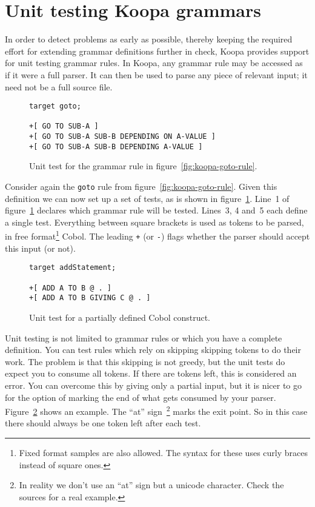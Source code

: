 \documentclass[a4paper]{article}
\begin{document}

\section{Unit testing Koopa grammars}
\label{testing}

In order to detect problems as early as possible, thereby keeping the required effort for extending grammar definitions further in check, Koopa provides support for unit testing grammar rules. In Koopa, any grammar rule may be accessed as if it were a full parser. It can then be used to parse any piece of relevant input; it need not be a full source file.

\begin{figure}
\centering
\begin{lstlisting}
target goto;

+[ GO TO SUB-A ]
+[ GO TO SUB-A SUB-B DEPENDING ON A-VALUE ]
+[ GO TO SUB-A SUB-B DEPENDING A-VALUE ]
\end{lstlisting}
\caption{Unit test for the grammar rule in figure~\ref{fig:koopa-goto-rule}.}
\label{fig:koopa-goto-test}
\end{figure}

Consider again the \lstinline|goto| rule from figure~\ref{fig:koopa-goto-rule}. Given this definition we can now set up a set of tests, as is shown in figure~\ref{fig:koopa-goto-test}. Line~1 of figure~\ref{fig:koopa-goto-test} declares which grammar rule will be tested. Lines~3, 4 and~5 each define a single test. Everything between square brackets is used as tokens to be parsed, in free format\footnote{\scriptsize Fixed format samples are also allowed. The syntax for these uses curly braces instead of square ones.} Cobol. The leading \lstinline|+| (or \lstinline|-|) flags whether the parser should accept this input (or not).

\begin{figure}
\centering
\begin{lstlisting}
target addStatement;

+[ ADD A TO B @ . ]
+[ ADD A TO B GIVING C @ . ]
\end{lstlisting}
\caption{Unit test for a partially defined Cobol construct.}
\label{fig:koopa-test-with-marker}
\end{figure}

Unit testing is not limited to grammar rules or which you have a complete definition. You can test rules which rely on skipping skipping tokens to do their work. The problem is that this skipping is not greedy, but the unit tests do expect you to consume all tokens. If there are tokens left, this is considered an error. You can overcome this by giving only a partial input, but it is nicer to go for the option of marking the end of what gets consumed by your parser. Figure~\ref{fig:koopa-test-with-marker} shows an example. The ``at'' sign~\footnote{\scriptsize In reality we don't use an ``at'' sign but a unicode character. Check the sources for a real example.} marks the exit point. So in this case there should always be one token left after each test.
\end{document}

